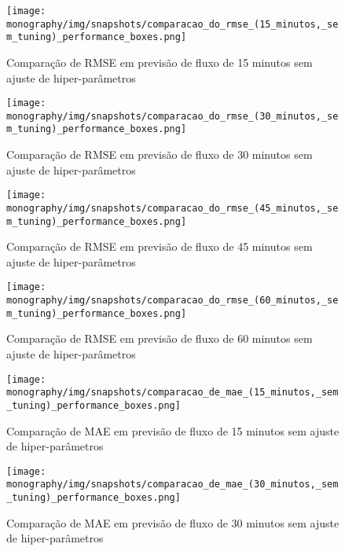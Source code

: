 \label{attachment:snapshots}

\begin{figure}[htbp]
    \centering
    \texttt{[image: monography/img/snapshots/comparacao\_do\_rmse\_(15\_minutos,\_sem\_tuning)\_performance\_boxes.png]}
    \label{figure:comparacao_previsao_rmse_15_sem_tuning}
    \caption{Comparação de RMSE em previsão de fluxo de 15 minutos sem ajuste de hiper-parâmetros}
\end{figure}

\begin{figure}[htbp]
    \centering
    \texttt{[image: monography/img/snapshots/comparacao\_do\_rmse\_(30\_minutos,\_sem\_tuning)\_performance\_boxes.png]}
    \label{figure:comparacao_previsao_rmse_30_sem_tuning}
    \caption{Comparação de RMSE em previsão de fluxo de 30 minutos sem ajuste de hiper-parâmetros}
\end{figure}

\begin{figure}[htbp]
    \centering
    \texttt{[image: monography/img/snapshots/comparacao\_do\_rmse\_(45\_minutos,\_sem\_tuning)\_performance\_boxes.png]}
    \label{figure:comparacao_previsao_rmse_45_sem_tuning}
    \caption{Comparação de RMSE em previsão de fluxo de 45 minutos sem ajuste de hiper-parâmetros}
\end{figure}

\begin{figure}[htbp]
    \centering
    \texttt{[image: monography/img/snapshots/comparacao\_do\_rmse\_(60\_minutos,\_sem\_tuning)\_performance\_boxes.png]}
    \label{figure:comparacao_previsao_rmse_60_sem_tuning}
    \caption{Comparação de RMSE em previsão de fluxo de 60 minutos sem ajuste de hiper-parâmetros}
\end{figure}

\begin{figure}[htbp]
    \centering
    \texttt{[image: monography/img/snapshots/comparacao\_de\_mae\_(15\_minutos,\_sem\_tuning)\_performance\_boxes.png]}
    \label{figure:comparacao_previsao_mae_15_sem_tuning}
    \caption{Comparação de MAE em previsão de fluxo de 15 minutos sem ajuste de hiper-parâmetros}
\end{figure}

\begin{figure}[htbp]
    \centering
    \texttt{[image: monography/img/snapshots/comparacao\_de\_mae\_(30\_minutos,\_sem\_tuning)\_performance\_boxes.png]}
    \label{figure:comparacao_previsao_mae_30_sem_tuning}
    \caption{Comparação de MAE em previsão de fluxo de 30 minutos sem ajuste de hiper-parâmetros}
\end{figure}

